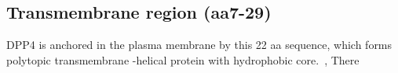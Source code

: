 \subsection{Transmembrane region (aa7-29)}

DPP4 is anchored in the plasma membrane by this 22 aa sequence, which forms polytopic transmembrane \alpha-helical protein with hydrophobic core.~\cite{Hong_1990}, There